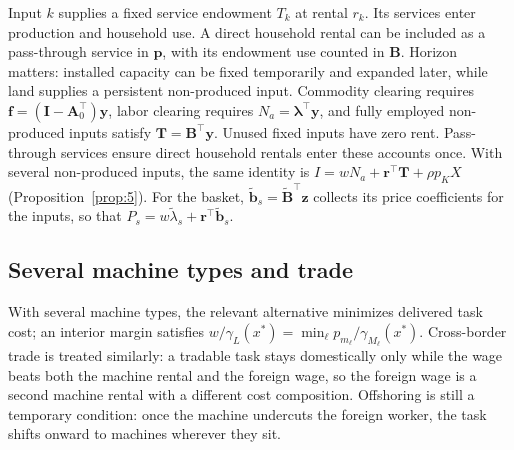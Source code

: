 \documentclass[12pt]{article}
\theoremstyle{plain}
\theoremstyle{definition}
\theoremstyle{remark}
\begin{document}
Input $k$ supplies a fixed service endowment $T_k$ at rental $r_k$. Its services enter production and household use. A direct household rental can be included as a pass-through service in $\mathbf{p}$, with its endowment use counted in $\mathbf{B}$. Horizon matters: installed capacity can be fixed temporarily and expanded later, while land supplies a persistent non-produced input.
Commodity clearing requires $\mathbf{f}=(\mathbf{I}-\mathbf{A}_0^{\top})\mathbf{y}$, labor clearing requires $N_a=\boldsymbol{\lambda}^{\top}\mathbf{y}$, and fully employed non-produced inputs satisfy $\mathbf{T}=\mathbf{B}^{\top}\mathbf{y}$. Unused fixed inputs have zero rent. Pass-through services ensure direct household rentals enter these accounts once.
With several non-produced inputs, the same identity is $I=wN_a+\mathbf{r}^{\top}\mathbf{T}+\rho p_KX$ (Proposition~\ref{prop:5}).
For the basket, $\widetilde{\mathbf b}_s=\widetilde{\mathbf B}^{\top}\mathbf z$ collects its price coefficients for the inputs, so that $P_s=w\widetilde\lambda_s+\mathbf r^{\top}\widetilde{\mathbf b}_s$.

\subsection{Several machine types and trade}\label{app:trade}

With several machine types, the relevant alternative minimizes delivered task cost; an interior margin satisfies $w/\gamma_L(x^*)=\min_\ell p_{m_\ell}/\gamma_{M_\ell}(x^*)$.
Cross-border trade is treated similarly: a tradable task stays domestically only while the wage beats both the machine rental and the foreign wage, so the foreign wage is a second machine rental with a different cost composition. Offshoring is still a temporary condition: once the machine undercuts the foreign worker, the task shifts onward to machines wherever they sit.
\end{document}
